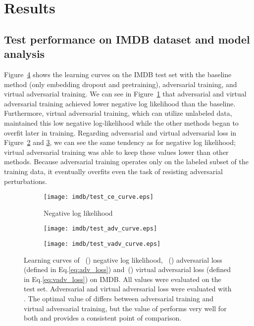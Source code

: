 \documentclass{article}
\begin{document}
\section{\label{sec:results}Results}
\subsection{\label{sec:results_imdb}Test performance on IMDB dataset and model analysis}

Figure~\ref{fig:imdb_curves} shows the learning curves on the IMDB test set with the
baseline method (only embedding dropout and pretraining), adversarial training, and virtual adversarial training.
We can see in Figure~\ref{fig:imdb_ce} that adversarial and virtual adversarial
training achieved lower negative log likelihood than the baseline.
Furthermore, virtual adversarial training, which can utilize unlabeled data,
maintained this low negative log-likelihood while the other methods
began to overfit later in training.
Regarding adversarial and virtual adversarial loss in
Figure~\ref{fig:imdb_adv} and \ref{fig:imdb_vadv}, we can see the same tendency as for
negative log likelihood; virtual adversarial training was able to keep these
values lower than other methods.
Because adversarial training operates only on the labeled subset of the training data,
it eventually overfits even the task of resisting adversarial perturbations.

\begin{figure}[ht]
	\begin{subfigure}[h]{0.33\textwidth}
			\texttt{[image: imdb/test\_ce\_curve.eps]}
			\caption{\label{fig:imdb_ce} Negative log likelihood}
	\end{subfigure}
	\begin{subfigure}[h]{0.33\textwidth}
			\texttt{[image: imdb/test\_adv\_curve.eps]}
			\caption{\label{fig:imdb_adv} }
	\end{subfigure}
	\begin{subfigure}[h]{0.33\textwidth}
			\texttt{[image: imdb/test\_vadv\_curve.eps]}
			\caption{\label{fig:imdb_vadv}  }
	\end{subfigure}
	\hspace*{\fill}
	\caption{\label{fig:imdb_curves} Learning curves of
	~() negative log likelihood, ~()
	adversarial loss (defined in Eq.\eqref{eq:adv_loss})
	and~() virtual adversarial loss (defined in
	Eq.\eqref{eq:vadv_loss}) on IMDB. All values were evaluated on the test
	set. Adversarial and virtual adversarial loss were evaluated with
	.
  The optimal value of  differs between adversarial training
  and virtual adversarial training, but the value of  performs very
  well for both and provides a consistent point of comparison.
  }
\end{figure}
\end{document}
